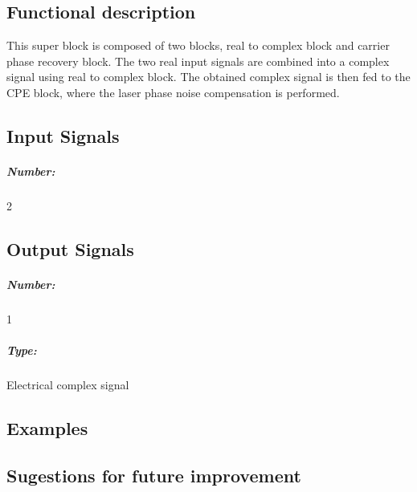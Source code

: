 \subsection*{Functional description}

This super block is composed of two blocks, real to complex block and carrier phase recovery block. The two real input signals are combined into a complex signal using real to complex block. The obtained complex signal is then fed to the CPE block, where the laser phase noise compensation is performed.


\pagebreak
\subsection*{Input Signals}

\subparagraph*{Number:} 2

\subsection*{Output Signals}

\subparagraph*{Number:} 1

\subparagraph*{Type:} Electrical complex signal

\subsection*{Examples}

\subsection*{Sugestions for future improvement}


